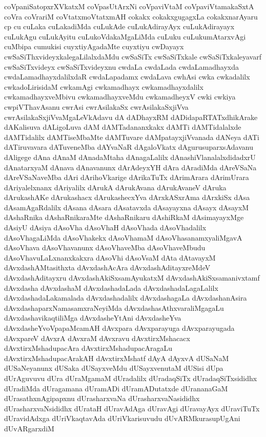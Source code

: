 {coVpaniSatopxrXVkatxM
coVpasUtArxNi
coVpaviVtaM
coVpaviVtamakaSxtA
coVra
coVrariM
coVtatxmoVtatxmAH
cokakx
cokakxgugagxLa
cokakxnarAyaru
cp
cu
cuLaka
cuLakadiMda
cuLukAde
cuLukAdirayAyx
cuLukAdirayayx
cuLukAgu
cuLukAyitu
cuLukoVdakaMgaLiMda
cuLuku
cuLukumAtarxvAgi
cuMbipa
cumukisi
cuyxtiyAgadaMte
cuyxtiyu
cwDayayx
cwSaSiThxvideyxkalegaLilalxdaMdu
cwSaSiTx
cwSaSiTxkale
cwSaSiTxkaleyavarf
cwSaSiTxvideyx
cwSaSiTxvideyxnu
cwdaLa
cwdaLada
cwdaLamadhayxda
cwdaLamadhayxdalilxdaR
cwdaLapadamx
cwdaLava
cwhAsi
cwka
cwkadalilx
cwkadoLirisidaM
cwkamAgi
cwkamadhayx
cwkamadhayxdalilx
cwkamadhayxveMbivu
cwkamadhayxveMdu
cwkamadheyxV
cwki
cwkiya
cwpiVThavAsanu
cwrAsi
cwrAsilakaSx
cwrAsilakaSxjiVva
cwrAsilakaSxjiVvaMgaLeVkAdavu
dA
dADhayxRM
dADidapaRTATxdhikArake
dAKalisuva
dALigoLuva
dAM
dAMTadananxkakx
dAMTi
dAMTidalalxde
dAMTidalilx
dAMTiseMbaMte
dAMTuvare
dAMpatayxjiVvanada
dANeya
dATi
dATiruvavara
dATuveneMba
dAYvaNaR
dAgaloVkatx
dAgurusuparxsAdavanu
dAligege
dAna
dAnaM
dAnadaMtaha
dAnagaLalilx
dAnashiVlanalalxdidadxrU
dAnatarxyaM
dAnava
dAnavanunx
dArAdeyxYH
dAra
dAradiMda
dAreVSaNa
dAreVSaNaveMba
dAri
dArihoVkarige
dArikaTuTx
dArimArara
dArimUrara
dAriyalelxnanx
dAriyalilx
dArukA
dArukAvana
dArukAvaneV
dAruka
dArukashAKe
dArukashacx
dArukashecxYva
dArxkASxrAma
dArxkiSx
dAsa
dAsamAgaRdalilx
dAsana
dAsara
dAsatavxda
dAsayayxna
dAsayx
dAsayxM
dAshaRnika
dAshaRnikaraMte
dAshaRnikaru
dAshiRkaM
dAsimayayxMge
dAsiyU
dAsiya
dAsoVha
dAsoVhaH
dAsoVhada
dAsoVhadalilx
dAsoVhagaLiMda
dAsoVhakekx
dAsoVhamaM
dAsoVhasanamxyaliMgavA
dAsoVhava
dAsoVhavanunx
dAsoVhaveMba
dAsoVhaveMbudu
dAsoVhavuLaLxnanxkakxra
dAsoVhi
dAsoVsaM
dAta
dAtavayxM
dAvxdashAMtasithxta
dAvxdashAcAra
dAvxdashAditayxreMdeV
dAvxdashAditayxru
dAvxdashAkiSxsamAyukatxM
dAvxdashAkiSxsamanivxtamf
dAvxdasha
dAvxdashaM
dAvxdashadaLada
dAvxdashadaLagaLalilx
dAvxdashadaLakamalada
dAvxdashadalilx
dAvxdashagaLa
dAvxdashanAsira
dAvxdashaparxNamasamxraNeyiMda
dAvxdashasAthxvaraliMgagaLu
dAvxdashavikaqtiliMga
dAvxdasheYtAni
dAvxdasheYva
dAvxdasheYvoVpapaMcamAH
dAvxpara
dAvxparayuga
dAvxparayugada
dAvxpareV
dAvxrA
dAvxraM
dAvxravu
dAvxtirxMshacacx
dAvxtirxMshadupacAra
dAvxtirxMshadupacAragaLu
dAvxtirxMshadupacArakAH
dAvxtirxMshatf
dAyA
dAyxvA
dUSaNaM
dUSaNeyanunx
dUSaka
dUSayxveMdu
dUSayxvenutaM
dUSisi
dUpa
dUrAguvuvu
dUra
dUraMgamaM
dUradalilx
dUradaqSiTx
dUradaqSiTxsididhx
dUradiMda
dUragamana
dUramADi
dUramADutatxde
dUrananaGaM
dUrasathxnAgipapxnu
dUrasharxvaNa
dUrasharxvaNasididhx
dUrasharxvaNsididhx
dUrataH
dUravAdAga
dUravAgi
dUravayAyx
dUraviTuTx
dUravidAdxga
dUriVkaqtavAda
dUriVkarisuvudu
dUvARMkurasupUgAni
dUvARgarxdiM
}

